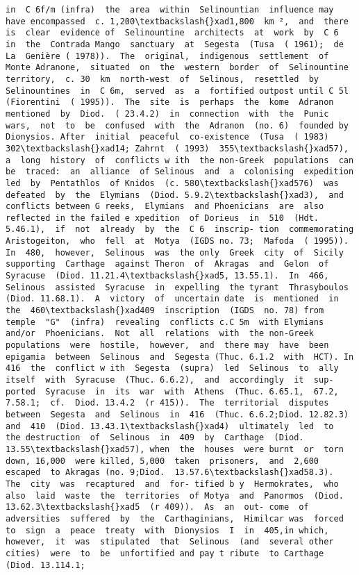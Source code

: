 \documentclass[11pt]{article}
\begin{document}
\begin{Verbatim}[commandchars=\\\{\}]
in  C 6f/m (infra)  the  area  within  Selinountian  influence may have encompassed  c. 1,200\textbackslash{}xad1,800  km ²,  and  there  is  clear  evidence of  Selinountine  architects  at  work  by  C 6  in  the  Contrada Mango  sanctuary  at  Segesta  (Tusa  ( 1961);  de  La  Genière ( 1978)).  The  original,  indigenous  settlement  of  Monte Adranone,  situated  on  the  western  border  of  Selinountine territory,  c. 30  km  north-west  of  Selinous,  resettled  by Selinountines  in  C 6m,  served  as  a  fortified outpost until C 5l (Fiorentini  ( 1995)).  The  site  is  perhaps  the  kome  Adranon mentioned  by  Diod.  ( 23.4.2)  in  connection  with  the  Punic wars,  not  to  be  confused  with  the  Adranon  (no. 6)  founded by  Dionysios. After  initial  peaceful  co-existence  (Tusa  ( 1983)  302\textbackslash{}xad14; Zahrnt  ( 1993)  355\textbackslash{}xad57),  a  long  history  of  conflicts w ith  the non-Greek  populations  can  be  traced:  an  alliance  of Selinous  and  a  colonising  expedition  led  by  Pentathlos  of Knidos  (c. 580\textbackslash{}xad576)  was  defeated  by  the  Elymians  (Diod. 5.9.2\textbackslash{}xad3),  and  conflicts between G reeks,  Elymians  and Phoenicians  are  also  reflected in the failed e xpedition  of Dorieus  in  510  (Hdt. 5.46.1),  if  not  already  by  the  C 6  inscrip- tion  commemorating  Aristogeiton,  who  fell  at  Motya  (IGDS no. 73;  Mafoda  ( 1995)).  In  480,  however,  Selinous  was  the only  Greek  city  of  Sicily  supporting  Carthage  against Theron  of  Akragas  and  Gelon  of  Syracuse  (Diod. 11.21.4\textbackslash{}xad5, 13.55.1).  In  466,  Selinous  assisted  Syracuse  in  expelling  the tyrant  Thrasyboulos  (Diod. 11.68.1).  A  victory  of  uncertain date  is  mentioned  in  the  460\textbackslash{}xad409  inscription  (IGDS  no. 78) from  temple  "G"  (infra)  revealing  conflicts c.C 5m  with Elymians  and/or  Phoenicians.  Not  all  relations  with  the non-Greek  populations  were  hostile,  however,  and  there may  have  been  epigamia  between  Selinous  and  Segesta (Thuc. 6.1.2  with  HCT). In 416  the  conflict w ith  Segesta  (supra)  led  Selinous  to  ally itself  with  Syracuse  (Thuc. 6.6.2),  and  accordingly  it  sup- ported  Syracuse  in  its  war  with  Athens  (Thuc. 6.65.1,  67.2, 7.58.1;  cf.  Diod. 13.4.2  (r 415)).  The  territorial  disputes between  Segesta  and  Selinous  in  416  (Thuc. 6.6.2;Diod. 12.82.3)  and  410  (Diod. 13.43.1\textbackslash{}xad4)  ultimately  led  to  the destruction  of  Selinous  in  409  by  Carthage  (Diod. 13.55\textbackslash{}xad57), when  the  houses  were burnt  or  torn down, 16,000  were killed, 5,000  taken  prisoners,  and  2,600  escaped  to Akragas (no. 9;Diod.  13.57.6\textbackslash{}xad58.3).  The  city  was  recaptured  and  for- tified b y  Hermokrates,  who  also  laid  waste  the  territories  of Motya  and  Panormos  (Diod. 13.62.3\textbackslash{}xad5  (r 409)).  As  an  out- come  of  adversities  suffered  by  the  Carthaginians,  Himilcar was  forced  to  sign  a  peace  treaty  with  Dionysios  I  in  405,in which,  however,  it  was  stipulated  that  Selinous  (and  several other  cities)  were  to  be  unfortified and pay t ribute  to Carthage  (Diod. 13.114.1;  
\end{Verbatim}
\end{document}

